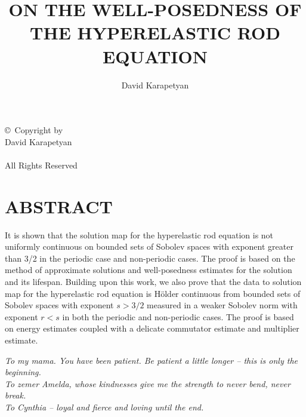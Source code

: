 \documentclass[12pt,oneside,reqno]{amsbook}
\numberwithin{equation}{section}
\numberwithin{section}{chapter}
\newcommand{\copypage}[1][\number\year]{\thispagestyle{empty}
        \begin{center}
          \copyright~Copyright by \\
          David Karapetyan \\
          #1 \\
          All Rights Reserved
	  \newpage
        \end{center}
        }
\begin{document}
\frontmatter         %
\title{ON THE WELL-POSEDNESS OF THE HYPERELASTIC ROD EQUATION}
\author{David Karapetyan}
\maketitle
\copypage
\cleardoublepage
\thispagestyle{empty}
\chapter*{ABSTRACT}
It is shown that the solution map for the hyperelastic rod equation is not
uniformly continuous on bounded sets of Sobolev spaces with exponent greater
than 3/2 in the periodic case and non-periodic cases. The proof is based on the
method of approximate solutions and well-posedness estimates for the solution
and its lifespan. Building upon this work, we also prove that the data to
solution map for the hyperelastic rod equation is H\"older continuous from
bounded sets of Sobolev spaces with exponent $s > 3/2$ measured in a weaker
Sobolev norm with exponent $r < s$ in both the periodic and non-periodic cases.
The proof is based on energy estimates coupled with a delicate commutator
estimate and multiplier estimate.


\cleardoublepage
\thispagestyle{empty}
\vspace*{13.5pc}
\begin{center}
\emph{To my mama. You have been patient. Be patient a little longer -- this is only the
   beginning. 
   \\
   \vspace{0.2in}
   To zemer Amelda, whose kindnesses
give me the strength to never bend, never break.
\\
\vspace{0.2in}
To Cynthia -- loyal and fierce and loving until the end. 
}
\end{center}
\cleardoublepage
\end{document}

